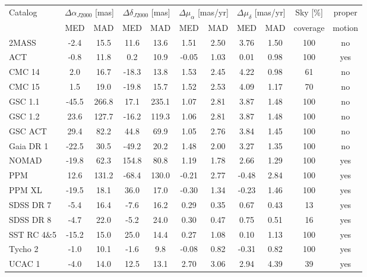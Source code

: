 \documentclass[review]{elsarticle}
\begin{document}
\begin{table}\tiny
\begin{center}
\begin{tabular}{|l|cc|cc|cc|cc|c|c|}
  \hline
Catalog & \multicolumn{2}{c}{$\Delta{\alpha}_{J2000}$ [mas]} & \multicolumn{2}{c}{$\Delta{\delta}_{J2000}$ [mas]} & \multicolumn{2}{c}{$\Delta\mu_{\alpha}$ [mas/yr]} &
\multicolumn{2}{c}{$\Delta\mu_{\delta}$ [mas/yr]} & Sky [\%] & proper\\
& MED & MAD & MED & MAD & MED & MAD &MED & MAD &coverage & motion\\ 
\hline
2MASS&  -2.4& 15.5& 11.6& 13.6& 1.51& 2.50& 3.76& 1.50& 100 & no \\ 
ACT&  -0.8& 11.8& 0.2& 10.9& -0.05& 1.03& 0.01& 0.98& 100 & yes\\ 
CMC 14& 2.0& 16.7& -18.3& 13.8& 1.53& 2.45& 4.22& 0.98& 61& no \\ 
CMC 15&  1.5& 19.0& -19.8& 15.7& 1.52& 2.53& 4.09& 1.17&70& no \\ 
GSC 1.1& -45.5& 266.8& 17.1& 235.1& 1.07& 2.81& 3.87& 1.48&100& no \\ 
GSC 1.2& 23.6& 127.7& -16.2& 119.3& 1.06& 2.81& 3.87& 1.48& 100& no \\ 
GSC ACT& 29.4& 82.2& 44.8& 69.9& 1.05& 2.76& 3.84& 1.45& 100& no\\ 
Gaia DR 1& -22.5& 30.5& -49.2& 20.2& 1.48& 2.00& 3.27& 1.35& 100 & no \\ 
NOMAD& -19.8& 62.3& 154.8& 80.8& 1.19& 1.78& 2.66& 1.29& 100& yes\\ 
PPM& 12.6& 131.2& -68.4& 130.0& -0.21& 2.77& -0.48& 2.84& 100& yes\\ 
PPM XL& -19.5& 18.1& 36.0& 17.0& -0.30& 1.34& -0.23& 1.46& 100& yes\\ 
SDSS DR 7& -5.4& 16.4& -7.6& 16.2& 0.29& 0.35& 0.67& 0.43& 13& yes\\ 
SDSS DR 8& -4.7& 22.0& -5.2& 24.0& 0.30& 0.47& 0.75& 0.51& 16& yes\\ 
SST RC 4\&5&-15.2& 15.0& 25.0& 14.4& 0.27& 1.08& 0.10& 1.13& 100& yes\\ 
Tycho 2& -1.0& 10.1& -1.6& 9.8& -0.08& 0.82& -0.31& 0.82& 100& yes\\ 
UCAC 1& -4.0& 14.0& 12.5& 13.1& 2.70& 3.06& 2.94& 4.39& 39& yes\\ 

\end{tabular}
\end{center}
\end{table}
\end{document}
